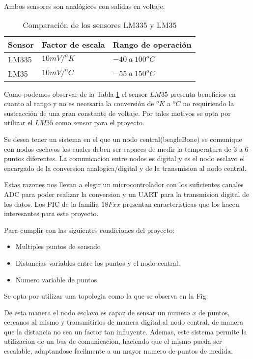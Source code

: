 Ambos sensores son analógicos con salidas en voltaje.
\begin{table}[H]
  \begin{tabular}{l l l}
    \toprule
    \textbf{Sensor} & \textbf{Factor de escala} & \textbf{Rango de operación} \\
    \toprule
    LM335 & $10mV/^o K$ & $-40~a~100 ^o C$\\
    LM35  & $10mV/^o C$ & $-55~a~150 ^o C$\\
    \bottomrule
  \end{tabular}
  \caption{Comparación de los sensores LM335 y LM35}
  \label{tab:compSens}
\end{table}

Como podemos observar de la Tabla \ref{tab:compSens} el sensor $LM35$ presenta beneficios 
en cuanto al rango y no es necesaria la conversión de $^o K$ a $^o C$ no requiriendo la
sustracción de una gran constante de voltaje. Por tales motivos se opta por utilizar el
$LM35$ como sensor para el proyecto.

Se desea tener un sistema en el que un nodo central(beagleBone) se comunique con nodos esclavos
los cuales deben ser capaces de medir la temperatura de 3 a 6 puntos diferentes. La comunicacion
entre nodos es digital y es el nodo esclavo el encargado de la conversion analogica/digital
y de la transmision al nodo central.

Estas razones nos llevan a elegir un microcontrolador con los suficientes canales ADC para
poder realizar la conversion y un UART para la transmision digital de los datos. Los PIC de 
la familia $18Fxx$ presentan caracteristicas que los hacen interesantes para este proyecto.

Para cumplir con las siguientes condiciones del proyecto:
\begin{itemize}
 \item Multiples puntos de sensado
 \item Distancias variables entre los puntos y el nodo central.
 \item Numero variable de puntos.
\end{itemize}
Se opta por utilizar una topologia como la que se observa en la Fig.

De esta manera el nodo esclavo es capaz de sensar un numero $x$ de puntos, cercanos al mismo
y transmitirlos de manera digital al nodo central, de manera que la distancia no sea un factor 
tan influyente. Ademas, este sistema permite la utilizacion de un bus de comunicacion, haciendo 
que el mismo pueda ser escalable, adaptandose facilmente a un mayor numero de
puntos de medida.

